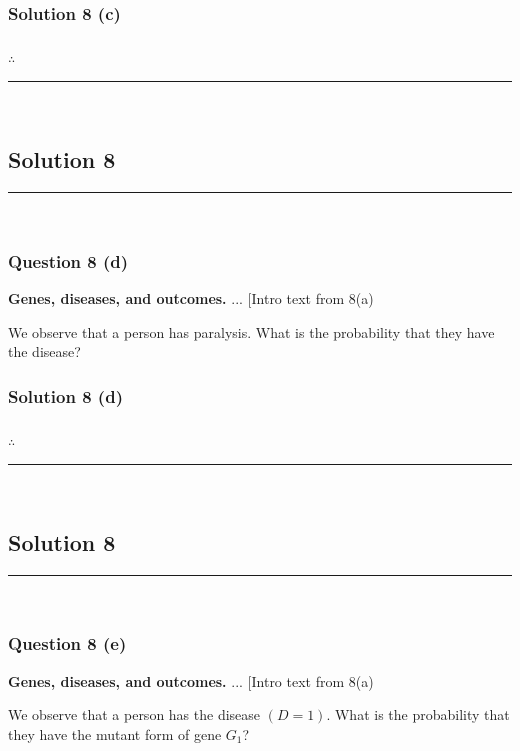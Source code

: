\documentclass{article}
\begin{document}
\subsubsection*{Solution 8 (c)}


\subsubsection*{\normalfont}{$\therefore$ }

\noindent\rule{\textwidth}{0.4pt}\\

\newpage

\subsection*{Solution 8}
\noindent\rule{\textwidth}{0.4pt}\\
\subsubsection*{Question 8 (d)}
\begin{flushleft}
    \textbf{Genes, diseases, and outcomes.} ... [Intro text from 8(a)  

    We observe that a person has paralysis. What is the probability that they have the disease? 
\end{flushleft}

\subsubsection*{Solution 8 (d)}


\subsubsection*{\normalfont}{$\therefore$ }

\noindent\rule{\textwidth}{0.4pt}\\

\newpage

\subsection*{Solution 8}
\noindent\rule{\textwidth}{0.4pt}\\
\subsubsection*{Question 8 (e)}
\begin{flushleft}
    \textbf{Genes, diseases, and outcomes.} ... [Intro text from 8(a)  

    We observe that a person has the disease $(D=1)$. 
    What is the probability that they have the mutant form of gene $G_1$? 
\end{flushleft}
\end{document}
